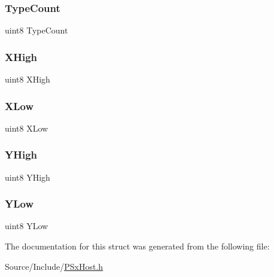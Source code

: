 \mbox{\label{structgunn_af8950e4872b4b4b5dd2b837ac45a0603}} 
\subsubsection{\texorpdfstring{Type\+Count}{TypeCount}}
{\footnotesize\ttfamily uint8 Type\+Count}

\mbox{\label{structgunn_a18095ef6ff08aaa798cef1c35376c781}} 
\subsubsection{\texorpdfstring{X\+High}{XHigh}}
{\footnotesize\ttfamily uint8 X\+High}

\mbox{\label{structgunn_a26f5cf872ef3b8114968d7150d71e36e}} 
\subsubsection{\texorpdfstring{X\+Low}{XLow}}
{\footnotesize\ttfamily uint8 X\+Low}

\mbox{\label{structgunn_aa1a96b187c7a76f29513186243075f2b}} 
\subsubsection{\texorpdfstring{Y\+High}{YHigh}}
{\footnotesize\ttfamily uint8 Y\+High}

\mbox{\label{structgunn_a484f771806ab7aa95378ccac10b3ddba}} 
\subsubsection{\texorpdfstring{Y\+Low}{YLow}}
{\footnotesize\ttfamily uint8 Y\+Low}



The documentation for this struct was generated from the following file\+:\begin{DoxyCompactItemize}
\item 
Source/\+Include/\mbox{\hyperlink{_p_sx_host_8h}{P\+Sx\+Host.\+h}}\end{DoxyCompactItemize}
